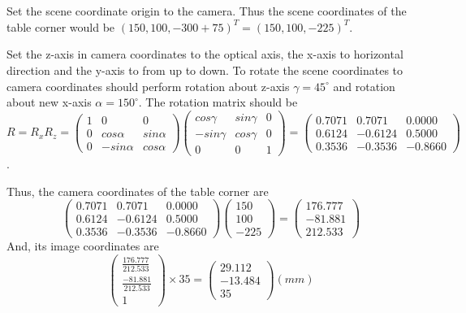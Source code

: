 \documentclass[a4paper,11pt]{article}
\begin{document}
\section{}
Set the scene coordinate origin to the camera. Thus the scene coordinates of the table corner would be $(150, 100, -300+75)^T = (150, 100, -225)^T $. 

Set the z-axis in camera coordinates to the optical axis, the x-axis to horizontal direction and the y-axis to from up to down. To rotate the scene coordinates to camera coordinates should perform rotation about z-axis $\gamma = 45^{\circ}$ and rotation about new x-axis $\alpha = 150^{\circ}$.
The rotation matrix should be
\[ R = R_x R_z
= \begin{pmatrix}
  1 & 0 & 0 \\
  0 & cos \alpha & sin \alpha \\
  0 & -sin \alpha & cos \alpha
\end{pmatrix}
 \begin{pmatrix}
  cos \gamma & sin \gamma & 0 \\
  -sin \gamma & cos \gamma & 0\\
  0 & 0 & 1
\end{pmatrix}
= \begin{pmatrix}
     0.7071 & 0.7071 & 0.0000 \\
   0.6124 & -0.6124 & 0.5000 \\
   0.3536 & -0.3536 & -0.8660
\end{pmatrix}
\].

Thus, the camera coordinates of the table corner are
\[
\begin{pmatrix}
     0.7071 & 0.7071 & 0.0000 \\
   0.6124 & -0.6124 & 0.5000 \\
   0.3536 & -0.3536 & -0.8660
\end{pmatrix}
\begin{pmatrix} 150 \\ 100 \\ -225 \end{pmatrix}
= \begin{pmatrix} 176.777 \\ -81.881 \\ 212.533 \end{pmatrix}
\]
And, its image coordinates are
\[
  \begin{pmatrix} \frac{176.777}{212.533} \\ \frac{-81.881}{212.533} \\ 1 \end{pmatrix} \times 35 
  = \begin{pmatrix} 29.112 \\ -13.484 \\ 35 \end{pmatrix} (mm)
\]
\end{document}
